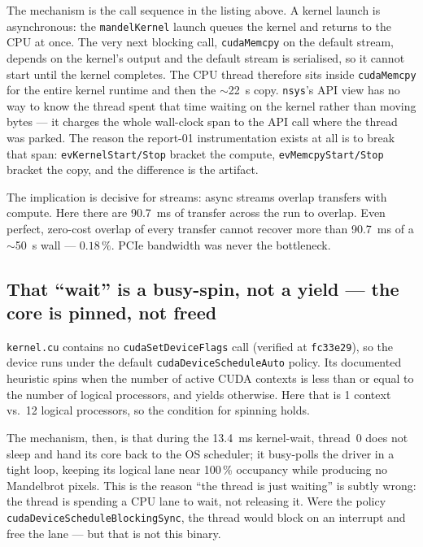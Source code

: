 \documentclass[
	english,
	letterpaper, oneside
]{article}
\begin{document}
The mechanism is the call sequence in the listing above. A kernel launch is
asynchronous: the \texttt{mandelKernel} launch queues the kernel and returns to
the CPU at once. The very next blocking call, \texttt{cudaMemcpy} on the default
stream, depends on the kernel's output and the default stream is serialised, so
it cannot start until the kernel completes. The CPU thread
therefore sits inside \texttt{cudaMemcpy} for the entire kernel runtime
and then the $\sim$22~\textmu s copy. \texttt{nsys}'s API view has no way to know
the thread spent that time waiting on the kernel rather than moving bytes --- it
charges the whole wall-clock span to the API call where the thread was parked.
The reason the report-01 instrumentation exists at all is to break that span:
\texttt{evKernelStart/Stop} bracket the compute, \texttt{evMemcpyStart/Stop}
bracket the copy, and the difference is the artifact.

The implication is decisive for streams: async streams overlap transfers
with compute. Here there are 90.7~ms of transfer across the run to overlap. Even
perfect, zero-cost overlap of every transfer cannot recover more than 90.7~ms of
a $\sim$50~s wall --- $0.18\,\%$. PCIe bandwidth was never the bottleneck.

\subsection{That ``wait'' is a busy-spin, not a yield --- the core is pinned, not freed}

\texttt{kernel.cu} contains no \texttt{cudaSetDeviceFlags} call (verified at
\texttt{fc33e29}), so the device runs under the default \texttt{cudaDeviceScheduleAuto}
policy. Its documented heuristic spins when the number of active CUDA contexts is
less than or equal to the number of logical processors, and yields otherwise.
Here that is 1 context vs.\ 12 logical processors, so the condition for
spinning holds.

The mechanism, then, is that during the 13.4~ms kernel-wait, thread~0 does not
sleep and hand its core back to the OS scheduler; it busy-polls the driver
in a tight loop, keeping its logical lane near 100\,\% occupancy while producing
no Mandelbrot pixels. This is the reason ``the thread is just waiting'' is
subtly wrong: the thread is spending a CPU lane to wait, not releasing it.
Were the policy \texttt{cudaDeviceScheduleBlockingSync}, the thread would block on
an interrupt and free the lane --- but that is not this binary.
\end{document}
